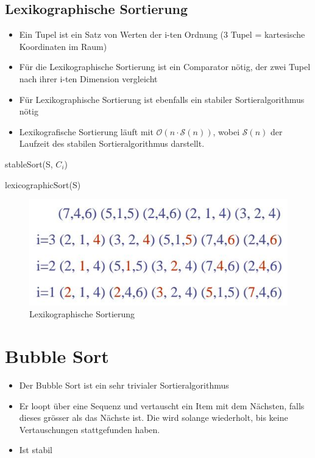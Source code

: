 \subsection{Lexikographische Sortierung}
\begin{itemize}
	\item Ein Tupel ist ein Satz von Werten der i-ten Ordnung (3 Tupel = kartesische Koordinaten im Raum)
	\item Für die Lexikographische Sortierung ist ein Comparator nötig, der zwei Tupel nach ihrer i-ten Dimension vergleicht
	\item Für Lexikographische Sortierung ist ebenfalls ein stabiler Sortieralgorithmus nötig
	\item Lexikografische Sortierung läuft mit $\mathcal{O}(n \cdot \mathcal{S}(n))$, wobei $\mathcal{S}(n)$ der Laufzeit des stabilen Sortieralgorithmus darstellt.
\end{itemize}

\begin{algorithm}[h!]
	
	{
		stableSort(S, $C_i$)
		
	}
	\caption{lexicographicSort(S)}
\end{algorithm}


\begin{figure}[h!]
	\centering
	\includegraphics[width=0.7\linewidth]{images/lexikographic_sort}
	\caption{Lexikographische Sortierung}
	\label{fig:lexikographicsort}
\end{figure}


\section{Bubble Sort}
\begin{itemize}
	\item Der Bubble Sort ist ein sehr trivialer Sortieralgorithmus
	\item Er loopt über eine Sequenz und vertauscht ein Item mit dem Nächsten, falls dieses grösser als das Nächste ist. Die wird solange wiederholt, bis keine Vertauschungen stattgefunden haben.
	\item Ist stabil
\end{itemize}

